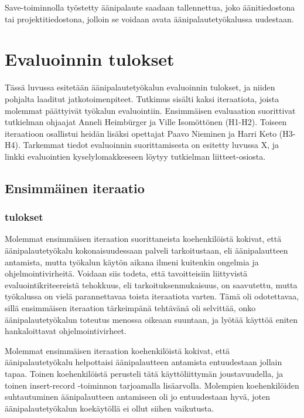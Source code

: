 \documentclass[utf8]{gradu3}
\begin{document}
Save-toiminnolla työstetty äänipalaute saadaan tallennettua, joko äänitiedostona tai projektitiedostona, jolloin se voidaan avata äänipalautetyökalussa uudestaan.

%

\chapter{Evaluoinnin tulokset}

Tässä luvussa esitetään äänipalautetyökalun evaluoinnin tulokset, ja niiden pohjalta laaditut jatkotoimenpiteet. Tutkimus sisälti kaksi iteraatiota, joista molemmat päättyivät työkalun evaluointiin. Ensimmäisen evaluaation suorittivat tutkielman ohjaajat Anneli Heimbürger ja Ville Isomöttönen (H1-H2). Toiseen iteraatioon osallistui heidän lisäksi opettajat Paavo Nieminen ja Harri Keto (H3-H4).  Tarkemmat tiedot evaluoinnin suorittamisesta on esitetty luvussa X, ja linkki evaluointien kyselylomakkeeseen löytyy tutkielman liitteet-osiosta.

\section{Ensimmäinen iteraatio}

\subsection{tulokset}

Molemmat ensimmäisen iteraation suorittaneista koehenkilöistä kokivat, että äänipalautetyökalu kokonaisuudessaan palveli tarkoitustaan, eli äänipalautteen antamista, mutta työkalun käytön aikana ilmeni kuitenkin  ongelmia ja ohjelmointivirheitä. Voidaan siis todeta, että tavoitteisiin liittyvistä evaluointikriteereistä tehokkuus, eli tarkoituksenmukaisuus, on saavutettu, mutta työkalussa on vielä parannettavaa toista iteraatiota varten. Tämä oli odotettavaa, sillä ensimmäisen iteraation tärkeimpänä tehtävänä oli selvittää, onko äänipalautetyökalun toteutus menossa oikeaan suuntaan, ja lyötää käyttöä eniten hankaloittavat ohjelmointivirheet.

Molemmat ensimmäisen iteraation koehenkilöistä kokivat, että äänipalautetyökalu helpottaisi äänipalautteen antamista entuudestaan jollain tapaa. Toinen koehenkilöistä perusteli tätä käyttöliittymän joustavuudella, ja toinen insert-record -toiminnon tarjoamalla lisäarvolla. Molempien koehenkilöiden suhtautuminen äänipalautteen antamiseen oli jo entuudestaan hyvä, joten äänipalautetyökalun koekäytöllä ei ollut siihen vaikutusta.
\end{document}

